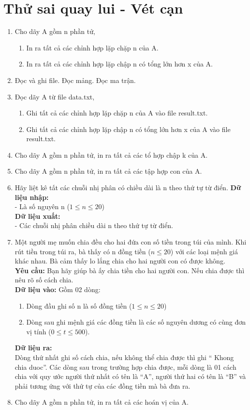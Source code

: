 \documentclass[12pt,a4paper]{article}
\begin{document}
\section{Thử sai quay lui - Vét cạn}
\begin{enumerate}
	\item Cho dãy A gồm n phần tử,
	\begin{enumerate}
		\item In ra tất cả các chỉnh hợp lặp chặp n của A.
		\item In ra tất cả các chỉnh hợp lặp chập n có tổng lớn hơn x của A.
	\end{enumerate}
	\item Đọc và ghi file. Đọc mảng. Đọc ma trận.
	\item Đọc dãy A từ file data.txt,
	\begin{enumerate}
		\item Ghi tất cả các chỉnh hợp lặp chặp n của A vào file result.txt.
		\item Ghi tất cả các chỉnh hợp lặp chập n có tổng lớn hơn x của A vào file result.txt.
	\end{enumerate}
	\item Cho dãy A gồm n phần tử, in ra tất cả các tổ hợp chập k của A.
	\item Cho dãy A gồm n phần tử, in ra tất cả các tập hợp con của A.
	\item Hãy liệt kê tất các chuỗi nhị phân có chiều dài là n theo thứ tự từ điển.
\textbf{Dữ liệu nhập:}\\
- Là số nguyên n ($1 \leq n \leq 20$)\\
\textbf{Dữ liệu xuất:}\\
- Các chuỗi nhị phân chiều dài n theo thứ tự từ điển.
	\item Một người mẹ muốn chia đều cho hai đứa con số tiền trong túi của mình. Khi rút tiền trong túi ra, bà thấy có n đồng tiền ($n \leq 20$) với các loại mệnh giá khác nhau. Bà cảm thấy lo lắng chia cho hai người con có được không. \\
\textbf{Yêu cầu:} Bạn hãy giúp bà ấy chia tiền cho hai người con. Nếu chia được thì nêu rõ số cách chia. \\
\textbf{Dữ liệu vào:} Gồm 02 dòng:
	\begin{enumerate}
		\item Dòng đầu ghi số n là số đồng tiền ($1 \leq n \leq 20$)
		\item Dòng sau ghi mệnh giá các đồng tiền là các số nguyên dương có cùng đơn vị tính ($0 \leq t\leq 500$).
	\end{enumerate}
\textbf{Dữ liệu ra:}\\
Dòng thứ nhất ghi số cách chia, nếu không thể chia được thì ghi “ Khong chia duoc”. Các dòng sau trong trường hợp chia được, mỗi dòng là 01 cách chia với quy ước người thứ nhất có tên là “A”, người thứ hai có tên là “B” và phải tương ứng với thứ tự của các đồng tiền mà bà đưa ra. 
	\item Cho dãy A gồm n phần tử, in ra tất cả các hoán vị của A.
	

\end{enumerate}
\end{document}
